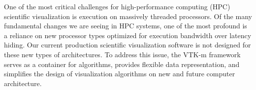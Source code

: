 \license


One of the most critical challenges for high-performance computing (HPC) scientific visualization is execution on massively threaded processors. Of the many fundamental changes we are seeing in HPC systems, one of the most profound is a reliance on new processor types optimized for execution bandwidth over latency hiding. Our current production scientific visualization software is not designed for these new types of architectures. To address this issue, the VTK-m framework serves as a container for algorithms, provides flexible data representation, and simplifies the design of visualization algorithms on new and future computer architecture.

